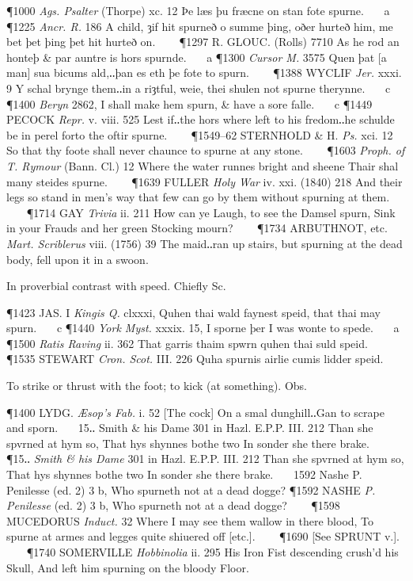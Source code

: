 \begin{description}[wide, labelwidth=!, labelindent=0pt]
\begin{myenumerate}
\P 1000 \textit{Ags.  Psalter} (Thorpe) xc. 12 Þe læs þu fræcne on stan fote spurne.    a 
\P 1225  \textit{Ancr. R.} 186 A child, ȝif hit spurneð o summe þing, oðer hurteð him, me bet þet þing þet hit hurteð on.    
\P 1297 R. GLOUC.  (Rolls) 7710 As he rod an honteþ \& par auntre is hors spurnde.    a 
\P 1300  \textit{Cursor M.} 3575 Quen þat [a man] sua bicums ald,‥þan es eth þe fote to spurn.    
\P 1388 WYCLIF  \textit{Jer.} xxxi. 9 Y schal brynge them‥in a riȝtful, weie, thei shulen not spurne therynne.    c 
\P 1400  \textit{Beryn} 2862, I shall make hem spurn, \& have a sore falle.    c 
\P 1449 PECOCK  \textit{Repr.} v. viii. 525 Lest if‥the hors where left to his fredom‥he schulde be in perel forto the oftir spurne.    
\P 1549–62 STERNHOLD \& H. \textit{Ps.} xci. 12 So that thy foote shall never chaunce to spurne at any stone.    
\P 1603 \textit{Proph.  of T. Rymour} (Bann. Cl.) 12 Where the water runnes bright and sheene Thair shal many steides spurne.    
\P 1639 FULLER  \textit{Holy War} iv. xxi. (1840) 218 And their legs so stand in men's way that few can go by them without spurning at them.    
\P 1714 GAY  \textit{Trivia} ii. 211 How can ye Laugh, to see the Damsel spurn, Sink in your Frauds and her green Stocking mourn?    
\P 1734 ARBUTHNOT, etc. \textit{Mart. Scriblerus} viii. (1756) 39 The maid‥ran up stairs, but spurning at the dead body, fell upon it in a swoon.

 In proverbial contrast with speed. Chiefly Sc.

\P 1423 JAS. I  \textit{Kingis Q.} clxxxi, Quhen thai wald faynest speid, that thai may spurn.    c 
\P 1440  \textit{York Myst.} xxxix. 15, I sporne þer I was wonte to spede.    a 
\P 1500 \textit{Ratis  Raving} ii. 362 That garris thaim spwrn quhen thai suld speid.    
\P 1535 STEWART  \textit{Cron. Scot.} III. 226 Quha spurnis airlie cumis lidder speid.

 To strike or thrust with the foot; to kick (at something). Obs.

\P 1400 LYDG.  \textit{Æsop's Fab.} i. 52 [The cock] On a smal dunghill‥Gan to scrape and sporn.    15‥ Smith \& his Dame 301 in Hazl. E.P.P. III. 212 Than she spvrned at hym so, That hys shynnes bothe two In sonder she there brake.    
\P 15‥ \textit{Smith \& his Dame} 301 in Hazl. E.P.P. III. 212 Than she spvrned at hym so, That hys shynnes bothe two In sonder she there brake.    1592 Nashe P. Penilesse (ed. 2) 3 b, Who spurneth not at a dead dogge?
\P 1592 NASHE  \textit{P. Penilesse} (ed. 2) 3 b, Who spurneth not at a dead dogge?    
\P 1598 MUCEDORUS  \textit{Induct.} 32 Where I may see them wallow in there blood, To spurne at armes and legges quite shiuered off [etc.].    
\P 1690 [See  SPRUNT v.].    
\P 1740 SOMERVILLE  \textit{Hobbinolia} ii. 295 His Iron Fist descending crush'd his Skull, And left him spurning on the bloody Floor.


\end{myenumerate}
\end{description}
